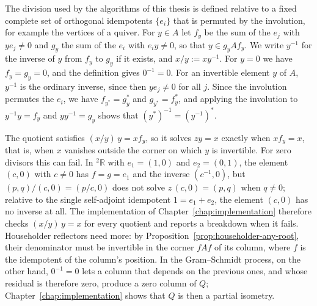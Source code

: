 \documentclass[12pt, a4paper]{report}
\theoremstyle{plain}
\theoremstyle{definition}
\theoremstyle{remark}
\theoremstyle{plain}
\newcommand{\twoR}{{}^{2}\mathbb{R}}
\begin{document}
The division used by the algorithms of this thesis is defined relative to a fixed complete set of orthogonal idempotents $\{e_i\}$ that is permuted by the involution, for example the vertices of a quiver. For $y\in A$ let $f_y$ be the sum of the $e_j$ with $ye_j\neq0$ and $g_y$ the sum of the $e_i$ with $e_iy\neq0$, so that $y\in g_yAf_y$. We write $y^{-1}$ for the inverse of $y$ from $f_y$ to $g_y$ if it exists, and $x/y:=xy^{-1}$. For $y=0$ we have $f_y=g_y=0$, and the definition gives $0^{-1}=0$. For an invertible element $y$ of $A$, $y^{-1}$ is the ordinary inverse, since then $ye_j\neq0$ for all $j$. Since the involution permutes the $e_i$, we have $f_{y^*}=g_y^*$ and $g_{y^*}=f_y^*$, and applying the involution to $y^{-1}y=f_y$ and $yy^{-1}=g_y$ shows that $(y^*)^{-1}=(y^{-1})^*$.

The quotient satisfies $(x/y)\,y=xf_y$, so it solves $zy=x$ exactly when $xf_y=x$, that is, when $x$ vanishes outside the corner on which $y$ is invertible. For zero divisors this can fail. In $\twoR$ with $e_1=(1,0)$ and $e_2=(0,1)$, the element $(c,0)$ with $c\neq0$ has $f=g=e_1$ and the inverse $(c^{-1},0)$, but $(p,q)/(c,0)=(p/c,0)$ does not solve $z\,(c,0)=(p,q)$ when $q\neq0$; relative to the single self-adjoint idempotent $1=e_1+e_2$, the element $(c,0)$ has no inverse at all. The implementation of Chapter~\ref{chap:implementation} therefore checks $(x/y)\,y=x$ for every quotient and reports a breakdown when it fails. Householder reflectors need more: by Proposition~\ref{prop:householder-any-root}, their denominator must be invertible in the corner $fAf$ of its column, where $f$ is the idempotent of the column's position. In the Gram--Schmidt process, on the other hand, $0^{-1}=0$ lets a column that depends on the previous ones, and whose residual is therefore zero, produce a zero column of $Q$; Chapter~\ref{chap:implementation} shows that $Q$ is then a partial isometry.
\end{document}
